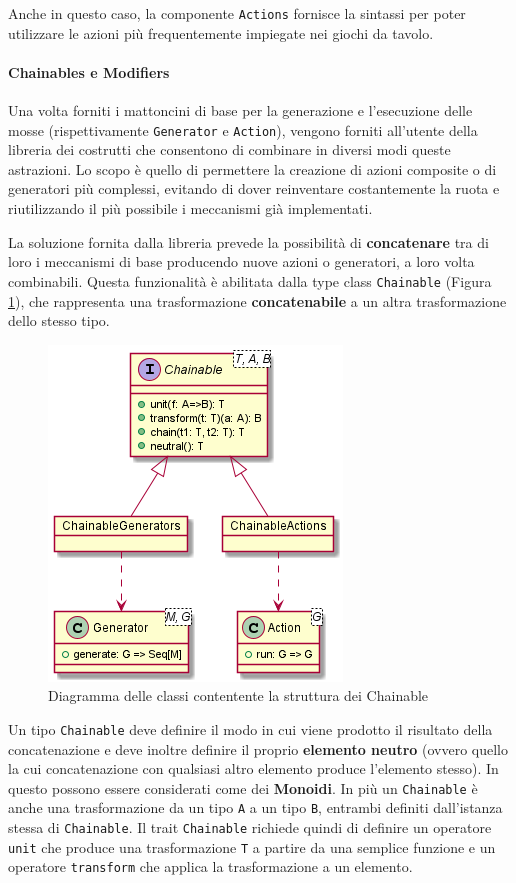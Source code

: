 Anche in questo caso, la componente \texttt{Actions} fornisce la sintassi per poter utilizzare le azioni più frequentemente impiegate nei giochi da tavolo.

\paragraph{Chainables e Modifiers}
Una volta forniti i mattoncini di base per la generazione e l'esecuzione delle mosse (rispettivamente \texttt{Generator} e \texttt{Action}), vengono forniti all'utente della libreria dei costrutti che consentono di combinare in diversi modi queste astrazioni.
%
Lo scopo è quello di permettere la creazione di azioni composite o di generatori più complessi, evitando di dover reinventare costantemente la ruota e riutilizzando il più possibile i meccanismi già implementati.

La soluzione fornita dalla libreria prevede la possibilità di \textbf{concatenare} tra di loro i meccanismi di base producendo nuove azioni o generatori, a loro volta combinabili.
%
Questa funzionalità è abilitata dalla type class \texttt{Chainable} (Figura \ref{fig:chainables}), che rappresenta una trasformazione \textbf{concatenabile} a un altra trasformazione dello stesso tipo.
%
\begin{figure}
    \centering
    \includegraphics[width=0.5\linewidth]{images/uml/chainables.png}
    \caption{Diagramma delle classi contentente la struttura dei Chainable}
    \label{fig:chainables}
\end{figure}

Un tipo \texttt{Chainable} deve definire il modo in cui viene prodotto il risultato della concatenazione e deve inoltre definire il proprio \textbf{elemento neutro} (ovvero quello la cui concatenazione con qualsiasi altro elemento produce l'elemento stesso).
%
In questo possono essere considerati come dei \textbf{Monoidi}.
%
In più un \texttt{Chainable} è anche una trasformazione da un tipo \texttt{A} a un tipo \texttt{B}, entrambi definiti dall'istanza stessa di \texttt{Chainable}.
%
Il trait \texttt{Chainable} richiede quindi di definire un operatore \texttt{unit} che produce una trasformazione \texttt{T} a partire da una semplice funzione e un operatore \texttt{transform} che applica la trasformazione a un elemento.

